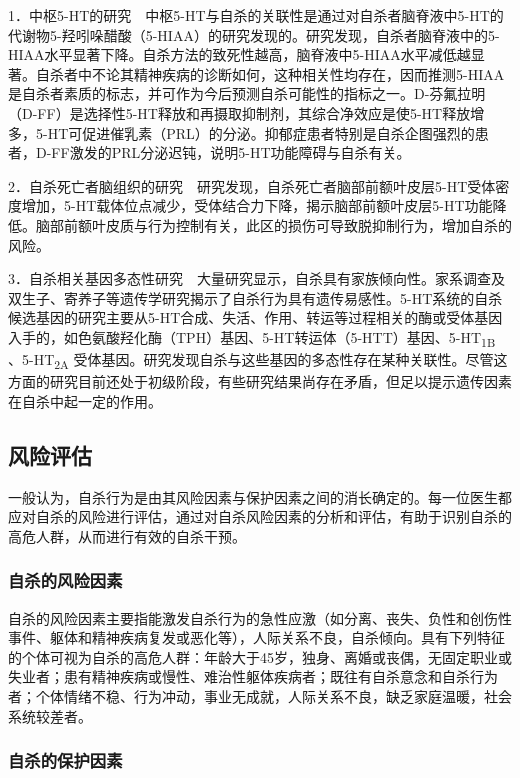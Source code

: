 1．中枢5-HT的研究　中枢5-HT与自杀的关联性是通过对自杀者脑脊液中5-HT的代谢物5-羟吲哚醋酸（5-HIAA）的研究发现的。研究发现，自杀者脑脊液中的5-HIAA水平显著下降。自杀方法的致死性越高，脑脊液中5-HIAA水平减低越显著。自杀者中不论其精神疾病的诊断如何，这种相关性均存在，因而推测5-HIAA是自杀者素质的标志，并可作为今后预测自杀可能性的指标之一。D-芬氟拉明（D-FF）是选择性5-HT释放和再摄取抑制剂，其综合净效应是使5-HT释放增多，5-HT可促进催乳素（PRL）的分泌。抑郁症患者特别是自杀企图强烈的患者，D-FF激发的PRL分泌迟钝，说明5-HT功能障碍与自杀有关。

2．自杀死亡者脑组织的研究　研究发现，自杀死亡者脑部前额叶皮层5-HT受体密度增加，5-HT载体位点减少，受体结合力下降，揭示脑部前额叶皮层5-HT功能降低。脑部前额叶皮质与行为控制有关，此区的损伤可导致脱抑制行为，增加自杀的风险。

3．自杀相关基因多态性研究　大量研究显示，自杀具有家族倾向性。家系调查及双生子、寄养子等遗传学研究揭示了自杀行为具有遗传易感性。5-HT系统的自杀候选基因的研究主要从5-HT合成、失活、作用、转运等过程相关的酶或受体基因入手的，如色氨酸羟化酶（TPH）基因、5-HT转运体（5-HTT）基因、5-HT\textsubscript{1B}
、5-HT\textsubscript{2A}
受体基因。研究发现自杀与这些基因的多态性存在某种关联性。尽管这方面的研究目前还处于初级阶段，有些研究结果尚存在矛盾，但足以提示遗传因素在自杀中起一定的作用。

\subsection{风险评估}

一般认为，自杀行为是由其风险因素与保护因素之间的消长确定的。每一位医生都应对自杀的风险进行评估，通过对自杀风险因素的分析和评估，有助于识别自杀的高危人群，从而进行有效的自杀干预。

\subsubsection{自杀的风险因素}

自杀的风险因素主要指能激发自杀行为的急性应激（如分离、丧失、负性和创伤性事件、躯体和精神疾病复发或恶化等），人际关系不良，自杀倾向。具有下列特征的个体可视为自杀的高危人群：年龄大于45岁，独身、离婚或丧偶，无固定职业或失业者；患有精神疾病或慢性、难治性躯体疾病者；既往有自杀意念和自杀行为者；个体情绪不稳、行为冲动，事业无成就，人际关系不良，缺乏家庭温暖，社会系统较差者。

\subsubsection{自杀的保护因素}

